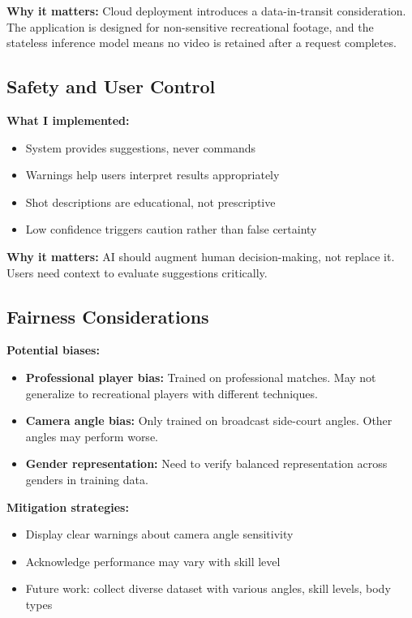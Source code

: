 \documentclass[11pt,a4paper]{article}
\begin{document}
\textbf{Why it matters:} Cloud deployment introduces a data-in-transit consideration. The application is designed for non-sensitive recreational footage, and the stateless inference model means no video is retained after a request completes.

\subsection{Safety and User Control}

\textbf{What I implemented:}
\begin{itemize}
\item System provides suggestions, never commands
\item Warnings help users interpret results appropriately
\item Shot descriptions are educational, not prescriptive
\item Low confidence triggers caution rather than false certainty
\end{itemize}

\textbf{Why it matters:} AI should augment human decision-making, not replace it. Users need context to evaluate suggestions critically.

\subsection{Fairness Considerations}

\textbf{Potential biases:}
\begin{itemize}
\item \textbf{Professional player bias:} Trained on professional matches. May not generalize to recreational players with different techniques.
\item \textbf{Camera angle bias:} Only trained on broadcast side-court angles. Other angles may perform worse.
\item \textbf{Gender representation:} Need to verify balanced representation across genders in training data.
\end{itemize}

\textbf{Mitigation strategies:}
\begin{itemize}
\item Display clear warnings about camera angle sensitivity
\item Acknowledge performance may vary with skill level
\item Future work: collect diverse dataset with various angles, skill levels, body types
\end{itemize}
\end{document}
